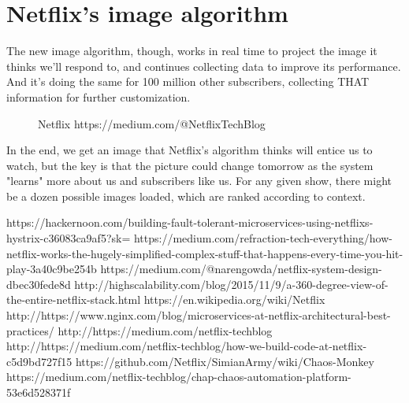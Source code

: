 \documentclass[9pt,twocolumn,twoside]{optica-suppl-materials}
\begin{document}
\section*{Netflix's image algorithm}
The new image algorithm, though, works in real time to project the image it thinks we'll respond to, and continues collecting data to improve its performance. And it's doing the same for 100 million other subscribers, collecting THAT information for further customization. 
\begin{figure}[htbp]
\centering
{}
\caption{Netflix https://medium.com/@NetflixTechBlog}
\label{fig:false-color}
\end{figure}
In the end, we get an image that Netflix's algorithm thinks will entice us to watch, but the key is that the picture could change tomorrow as the system "learns" more about us and subscribers like us. For any given show, there might be a dozen possible images loaded, which are ranked according to context. 


\begin{thebibliography}{}
\bibitem{}https://hackernoon.com/building-fault-tolerant-microservices-using-netflixs-hystrix-c36083ca9af5?sk=
\bibitem{}https://medium.com/refraction-tech-everything/how-netflix-works-the-hugely-simplified-complex-stuff-that-happens-every-time-you-hit-play-3a40c9be254b
\bibitem{}https://medium.com/@narengowda/netflix-system-design-dbec30fede8d
\bibitem{}http://highscalability.com/blog/2015/11/9/a-360-degree-view-of-the-entire-netflix-stack.html
\bibitem{}https://en.wikipedia.org/wiki/Netflix
\bibitem{}http://https://www.nginx.com/blog/microservices-at-netflix-architectural-best-practices/
\bibitem{}http://https://medium.com/netflix-techblog
\bibitem{}http://https://medium.com/netflix-techblog/how-we-build-code-at-netflix-c5d9bd727f15
\bibitem{}https://github.com/Netflix/SimianArmy/wiki/Chaos-Monkey
\bibitem{}https://medium.com/netflix-techblog/chap-chaos-automation-platform-53e6d528371f

\end{thebibliography}
\end{document}
